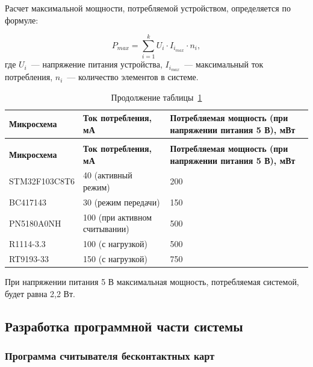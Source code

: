 Расчет максимальной мощности, потребляемой устройством, определяется по формуле:

$$
P_{max} = \sum_{i=1}^{k} U_i \cdot I_{i_{max}} \cdot n_i,
$$
где $U_i$~--- напряжение питания устройства, $I_{i_{max}}$~--- максимальный ток потребления, $n_i$~--- количество элементов в системе.

\begin{longtable}[l]{|
P{0.25\textwidth}|
P{0.3\textwidth}|
P{0.37\textwidth}|}

    \caption{Расчет потребляемой мощности}
    \label{tab:elements_power} \\
    \hline
    \textbf{Микросхема} &
    \textbf{Ток потребления, мА} &
    \textbf{Потребляемая мощность (при напряжении питания 5 В), мВт} \\
    \hline
    \endfirsthead

    \caption*{Продолжение таблицы~\ref{tab:elements_power}} \\
    \hline
    \textbf{Микросхема} &
    \textbf{Ток потребления, мА} &
    \textbf{Потребляемая мощность (при напряжении питания 5 В), мВт} \\
    \hline
    \endhead

    \hline
    \endfoot

    \hline
    \endlastfoot

    STM32F103C8T6 & 40 (активный режим) & 200 \\ \hline

    BC417143  & 30 (режим передачи) & 150 \\ \hline

    PN5180A0NH & 100 (при активном считывании) & 500 \\ \hline

    R1114-3.3 & 100 (с нагрузкой) & 500 \\ \hline

    RT9193-33 & 150 (с нагрузкой) & 750 \\ \hline

\end{longtable}

При напряжении питания 5 В максимальная мощность, потребляемая системой, будет равна 2,2 Вт.


\subsection{Разработка программной части системы}

\subsubsection{Программа считывателя бесконтактных карт}

